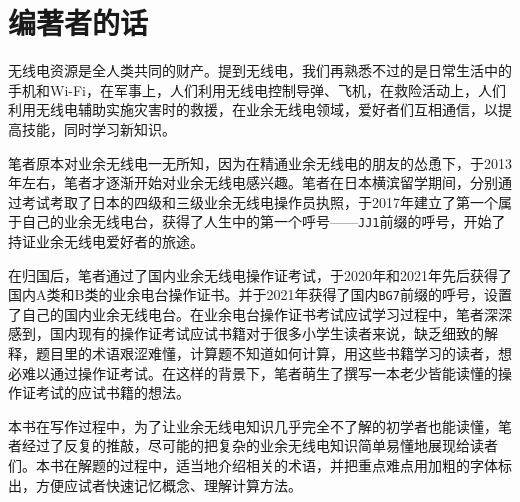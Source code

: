 \chapter*{编著者的话}

无线电资源是全人类共同的财产。提到无线电，我们再熟悉不过的是日常生活中的手机和Wi-Fi，在军事上，人们利用无线电控制导弹、飞机，在救险活动上，人们利用无线电辅助实施灾害时的救援，在业余无线电领域，爱好者们互相通信，以提高技能，同时学习新知识。

笔者原本对业余无线电一无所知，因为在精通业余无线电的朋友的怂恿下，于2013年左右，笔者才逐渐开始对业余无线电感兴趣。笔者在日本横滨留学期间，分别通过考试考取了日本的四级和三级业余无线电操作员执照，于2017年建立了第一个属于自己的业余无线电台，获得了人生中的第一个呼号——\texttt{JJ1}前缀的呼号，开始了持证业余无线电爱好者的旅途。

在归国后，笔者通过了国内业余无线电操作证考试，于2020年和2021年先后获得了国内A类和B类的业余电台操作证书。并于2021年获得了国内\texttt{BG7}前缀的呼号，设置了自己的国内业余无线电台。在业余电台操作证书考试应试学习过程中，笔者深深感到，国内现有的操作证考试应试书籍对于很多小学生读者来说，缺乏细致的解释，题目里的术语艰涩难懂，计算题不知道如何计算，用这些书籍学习的读者，想必难以通过操作证考试。在这样的背景下，笔者萌生了撰写一本老少皆能读懂的操作证考试的应试书籍的想法。

本书在写作过程中，为了让业余无线电知识几乎完全不了解的初学者也能读懂，笔者经过了反复的推敲，尽可能的把复杂的业余无线电知识简单易懂地展现给读者们。本书在解题的过程中，适当地介绍相关的术语，并把重点难点用加粗的字体标出，方便应试者快速记忆概念、理解计算方法。


